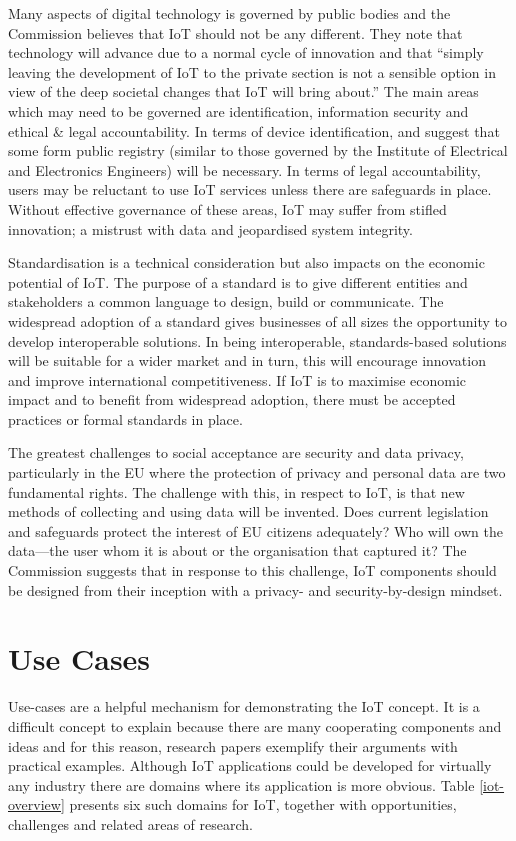     Many aspects of digital technology is governed by public bodies and the Commission believes that IoT should not be any different. They note that technology will advance due to a normal cycle of innovation and that ``simply leaving the development of IoT to the private section is not a sensible option in view of the deep societal changes that IoT will bring about.'' The main areas which may need to be governed are identification, information security and ethical \& legal accountability. In terms of device identification, \citet{fromIoC} and \citep{ECIoT:2009} suggest that some form public registry (similar to those governed by the Institute of Electrical and Electronics Engineers) will be necessary. In terms of legal accountability, users may be reluctant to use IoT services unless there are safeguards in place. Without effective governance of these areas, IoT may suffer from stifled innovation; a mistrust with data and jeopardised system integrity.

    Standardisation is a technical consideration but also impacts on the economic potential of IoT. The purpose of a standard is to give different entities and stakeholders a common language to design, build or communicate. The widespread adoption of a standard gives businesses of all sizes the opportunity to develop interoperable solutions. In being interoperable, standards-based solutions will be suitable for a wider market and in turn, this will encourage innovation and improve international competitiveness. If IoT is to maximise economic impact and to benefit from widespread adoption, there must be accepted practices or formal standards in place.

    The greatest challenges to social acceptance are security and data privacy, particularly in the EU where the protection of privacy and personal data are two fundamental rights. The challenge with this, in respect to IoT, is that new methods of collecting and using data will be invented. Does current legislation and safeguards protect the interest of EU citizens adequately? Who will own the data---the user whom it is about or the organisation that captured it? The Commission suggests that in response to this challenge, IoT components should be designed from their inception with a privacy- and security-by-design mindset.

  \section{Use Cases}\label{use-cases}
    Use-cases are a helpful mechanism for demonstrating the IoT concept. It is a difficult concept to explain because there are many cooperating components and ideas and for this reason, research papers exemplify their arguments with practical examples. Although IoT applications could be developed for virtually any industry there are domains where its application is more obvious. Table \ref{iot-overview} presents six such domains for IoT, together with opportunities, challenges and related areas of research.

